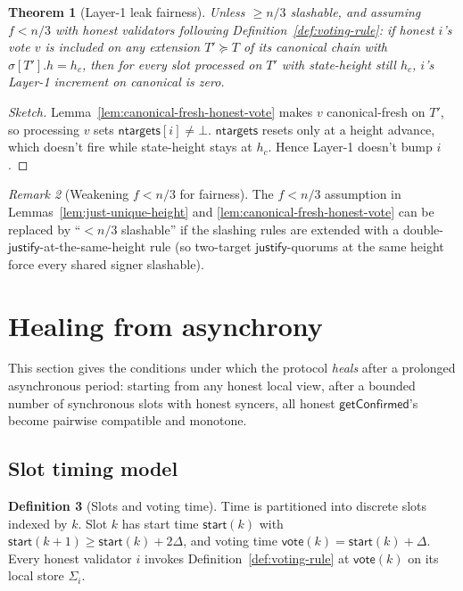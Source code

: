 \documentclass{article}
\newcommand{\just}{\ensuremath{\mathsf{justify}}\xspace}
\newcommand{\ntargets}{\mathsf{ntargets}}
\newcommand{\start}{\mathsf{start}}
\newcommand{\vote}{\mathsf{vote}}
\newcommand{\getConfirmed}{\textsf{getConfirmed}\xspace}
\theoremstyle{plain}
\newtheorem{theorem}{Theorem}
\theoremstyle{definition}
\newtheorem{definition}[theorem]{Definition}
\theoremstyle{remark}
\newtheorem{remark}[theorem]{Remark}
\begin{document}
\begin{theorem}[Layer-1 leak fairness]\label{thm:fairness}
Unless $\geq n/3$ slashable, and assuming $f < n/3$ with honest validators following Definition~\ref{def:voting-rule}: if honest $i$'s vote $v$ is included on any extension $T' \succeq T$ of its canonical chain with $\sigma[T'].h = h_c$, then for every slot processed on $T'$ with state-height still $h_c$, $i$'s Layer-1 increment on canonical is zero.
\end{theorem}

\begin{proof}[Sketch] Lemma~\ref{lem:canonical-fresh-honest-vote} makes $v$ canonical-fresh on $T'$, so processing $v$ sets $\ntargets[i] \neq \bot$. $\ntargets$ resets only at a height advance, which doesn't fire while state-height stays at $h_c$. Hence Layer-1 doesn't bump $i$. \end{proof}

\begin{remark}[Weakening $f < n/3$ for fairness]\label{rem:weak-fairness}
The $f < n/3$ assumption in Lemmas~\ref{lem:just-unique-height} and \ref{lem:canonical-fresh-honest-vote} can be replaced by ``$< n/3$ slashable'' if the slashing rules are extended with a double-\just-at-the-same-height rule (so two-target \just-quorums at the same height force every shared signer slashable).
\end{remark}

\section{Healing from asynchrony}\label{sec:healing}

This section gives the conditions under which the protocol \emph{heals} after a prolonged asynchronous period: starting from any honest local view, after a bounded number of synchronous slots with honest syncers, all honest $\getConfirmed$'s become pairwise compatible and monotone.

\subsection{Slot timing model}

\begin{definition}[Slots and voting time]\label{def:slots}
Time is partitioned into discrete slots indexed by $k$. Slot $k$ has start time $\start(k)$ with $\start(k+1) \geq \start(k) + 2\Delta$, and voting time $\vote(k) = \start(k) + \Delta$. Every honest validator $i$ invokes Definition~\ref{def:voting-rule} at $\vote(k)$ on its local store $\Sigma_i$.
\end{definition}
\end{document}
